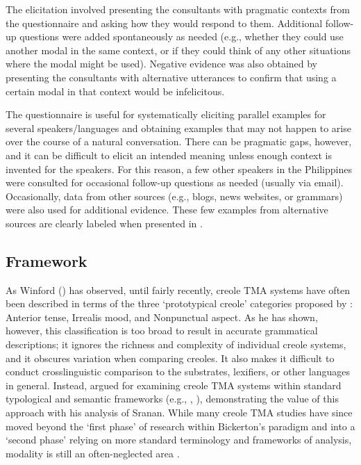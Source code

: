\documentclass[output=paper,colorlinks,citecolor=brown]{langscibook}
\begin{document}
The elicitation involved presenting the consultants with pragmatic contexts from the questionnaire and asking how they would respond to them. Additional follow-up questions were added spontaneously as needed (e.g., whether they could use another modal in the same context, or if they could think of any other situations where the modal might be used). Negative evidence was also obtained by presenting the consultants with alternative utterances to confirm that using a certain modal in that context would be infelicitous.  

The \citet{Dahl1985} questionnaire is useful for systematically eliciting parallel examples for several speakers/languages and obtaining examples that may not happen to arise over the course of a natural conversation. There can be pragmatic gaps, however, and it can be difficult to elicit an intended meaning unless enough context is invented for the speakers. For this reason, a few other speakers in the Philippines were consulted for occasional follow-up questions as needed (usually via email). Occasionally, data from other sources (e.g., blogs, news websites, or grammars) were also used for additional evidence. These few examples from alternative sources are clearly labeled when presented in .

\subsection{Framework}

As Winford (\citeyear{Winford2000_irrealis,Winford2018}) has observed, until fairly recently, creole TMA systems have often been described in terms of the three ‘prototypical creole’ categories proposed by \citet{Bickerton1984}: Anterior tense, Irrealis mood, and Nonpunctual aspect. As he has shown, however, this classification is too broad to result in accurate grammatical descriptions; it ignores the richness and complexity of individual creole systems, and it obscures variation when comparing creoles. It also makes it difficult to conduct crosslinguistic comparison to the substrates, lexifiers, or other languages in general. Instead, \citet{Winford2000_irrealis} argued for examining creole TMA systems within standard typological and semantic frameworks (e.g., \citealt{BybeePagliuca1994}, \citealt{Palmer2001}), demonstrating the value of this approach with his analysis of Sranan. While many creole TMA studies have since moved beyond the ‘first phase’ of research within Bickerton’s paradigm and into a ‘second phase’ relying on more standard terminology and frameworks of analysis, modality is still an often-neglected area \citep{Winford2018}.
\end{document}
